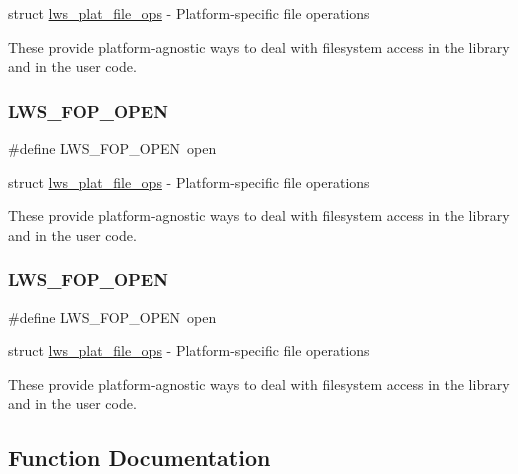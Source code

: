 struct \hyperlink{structlws__plat__file__ops}{lws\+\_\+plat\+\_\+file\+\_\+ops} -\/ Platform-\/specific file operations

These provide platform-\/agnostic ways to deal with filesystem access in the library and in the user code. \mbox{\label{group__fops_ga7972d4b546c7af37bb76d4c60f2ad553}} 
\subsubsection{\texorpdfstring{L\+W\+S\+\_\+\+F\+O\+P\+\_\+\+O\+P\+EN}{LWS\_FOP\_OPEN}\hspace{0.1cm}{\footnotesize\ttfamily [5/6]}}
{\footnotesize\ttfamily \#define L\+W\+S\+\_\+\+F\+O\+P\+\_\+\+O\+P\+EN~open}

struct \hyperlink{structlws__plat__file__ops}{lws\+\_\+plat\+\_\+file\+\_\+ops} -\/ Platform-\/specific file operations

These provide platform-\/agnostic ways to deal with filesystem access in the library and in the user code. \mbox{\label{group__fops_ga7972d4b546c7af37bb76d4c60f2ad553}} 
\subsubsection{\texorpdfstring{L\+W\+S\+\_\+\+F\+O\+P\+\_\+\+O\+P\+EN}{LWS\_FOP\_OPEN}\hspace{0.1cm}{\footnotesize\ttfamily [6/6]}}
{\footnotesize\ttfamily \#define L\+W\+S\+\_\+\+F\+O\+P\+\_\+\+O\+P\+EN~open}

struct \hyperlink{structlws__plat__file__ops}{lws\+\_\+plat\+\_\+file\+\_\+ops} -\/ Platform-\/specific file operations

These provide platform-\/agnostic ways to deal with filesystem access in the library and in the user code. 

\subsection{Function Documentation}
\mbox{\label{group__fops_gac08aef64c4c34647ed699b24759b6b0e}} 
